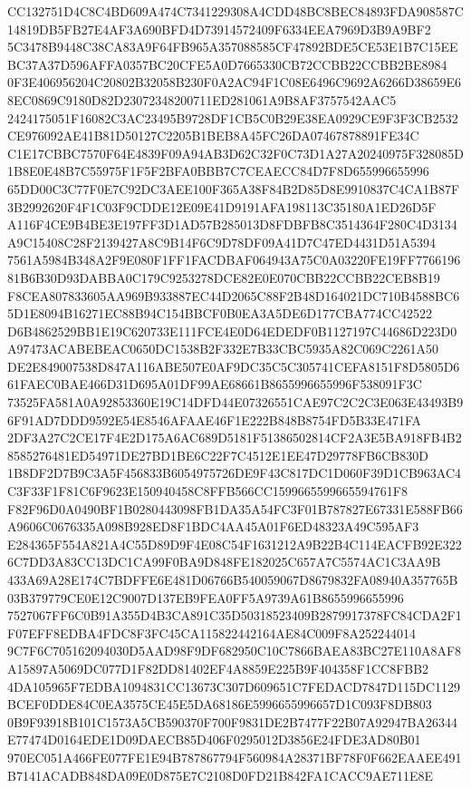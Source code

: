 \documentclass[UTF8,fontset=fandol,zihao=-4,a4paper]{ctexart}
\begin{document}
{{CC132751D4C8C4BD609A474C7341229308A4CDD48BC8BEC84893FDA908587C14819DB5FB27E4AF3A690BFD4D73914572409F6334EEA7969D3B9A9BF2
5C3478B9448C38CA83A9F64FB965A357088585CF47892BDE5CE53E1B7C15EEBC37A37D596AFFA0357BC20CFE5A0D7665330CB72CCBB22CCBB2BE8984
0F3E406956204C20802B32058B230F0A2AC94F1C08E6496C9692A6266D38659E68EC0869C9180D82D23072348200711ED281061A9B8AF3757542AAC5
2424175051F16082C3AC23495B9728DF1CB5C0B29E38EA0929CE9F3F3CB2532CE976092AE41B81D50127C2205B1BEB8A45FC26DA07467878891FE34C
C1E17CBBC7570F64E4839F09A94AB3D62C32F0C73D1A27A20240975F328085D1B8E0E48B7C55975F1F5F2BFA0BBB7C7CEAECC84D7F8D655996655996
65DD00C3C77F0E7C92DC3AEE100F365A38F84B2D85D8E9910837C4CA1B87F3B2992620F4F1C03F9CDDE12E09E41D9191AFA198113C35180A1ED26D5F
A116F4CE9B4BE3E197FF3D1AD57B285013D8FDBFB8C3514364F280C4D3134A9C15408C28F2139427A8C9B14F6C9D78DF09A41D7C47ED4431D51A5394
7561A5984B348A2F9E080F1FF1FACDBAF064943A75C0A03220FE19FF776619681B6B30D93DABBA0C179C9253278DCE82E0E070CBB22CCBB22CEB8B19
F8CEA807833605AA969B933887EC44D2065C88F2B48D164021DC710B4588BC65D1E8094B16271EC88B94C154BBCF0B0EA3A5DE6D177CBA774CC42522
D6B4862529BB1E19C620733E111FCE4E0D64EDEDF0B1127197C44686D223D0A97473ACABEBEAC0650DC1538B2F332E7B33CBC5935A82C069C2261A50
DE2E849007538D847A116ABE507E0AF9DC35C5C305741CEFA8151F8D5805D661FAEC0BAE466D31D695A01DF99AE68661B8655996655996F538091F3C
73525FA581A0A92853360E19C14DFD44E07326551CAE97C2C2C3E063E43493B96F91AD7DDD9592E54E8546AFAAE46F1E222B848B8754FD5B33E471FA
2DF3A27C2CE17F4E2D175A6AC689D5181F51386502814CF2A3E5BA918FB4B28585276481ED54971DE27BD1BE6C22F7C4512E1EE47D29778FB6CB830D
1B8DF2D7B9C3A5F456833B6054975726DE9F43C817DC1D060F39D1CB963AC4C3F33F1F81C6F9623E150940458C8FFB566CC1599665599665594761F8
F82F96D0A0490BF1B0280443098FB1DA35A54FC3F01B787827E67331E588FB66A9606C0676335A098B928ED8F1BDC4AA45A01F6ED48323A49C595AF3
E284365F554A821A4C55D89D9F4E08C54F1631212A9B22B4C114EACFB92E3226C7DD3A83CC13DC1CA99F0BA9D848FE182025C657A7C5574AC1C3AA9B
433A69A28E174C7BDFFE6E481D06766B540059067D8679832FA08940A357765B03B379779CE0E12C9007D137EB9FEA0FF5A9739A61B8655996655996
7527067FF6C0B91A355D4B3CA891C35D50318523409B2879917378FC84CDA2F1F07EFF8EDBA4FDC8F3FC45CA115822442164AE84C009F8A252244014
9C7F6C705162094030D5AAD98F9DF682950C10C7866BAEA83BC27E110A8AF8A15897A5069DC077D1F82DD81402EF4A8859E225B9F404358F1CC8FBB2
4DA105965F7EDBA1094831CC13673C307D609651C7FEDACD7847D115DC1129BCEF0DDE84C0EA3575CE45E5DA68186E5996655996657D1C093F8DB803
0B9F93918B101C1573A5CB590370F700F9831DE2B7477F22B07A92947BA26344E77474D0164EDE1D09DAECB85D406F0295012D3856E24FDE3AD80B01
970EC051A466FE077FE1E94B787867794F560984A28371BF78F0F662EAAEE491B7141ACADB848DA09E0D875E7C2108D0FD21B842FA1CACC9AE711E8E
}}
\end{document}
